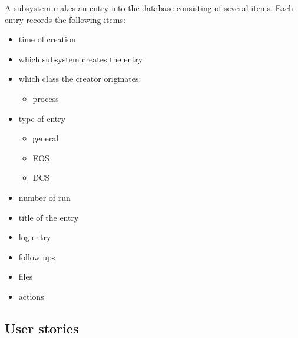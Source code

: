 A subsystem makes an entry into the database consisting of several items. Each entry records the following items:
  \begin{itemize}
    \item time of creation
    \item which subsystem creates the entry
    \item which class the creator originates:
    \begin{itemize}
      \item process
    \end{itemize}
    \item type of entry
    \begin{itemize}
      \item general
      \item EOS
      \item DCS
    \end{itemize}
    \item number of run
    \item title of the entry
    \item log entry
    \item follow ups
    \item files
    \item actions
  \end{itemize}

\subsection{User stories}
